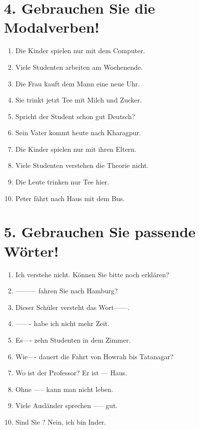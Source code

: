 \documentclass[a4paper,12pt]{article}
\begin{document}
\section*{4. Gebrauchen Sie die Modalverben!}

\begin{enumerate}[label=(\alph*)]
    \item Die Kinder spielen nur mit dem Computer.
    \item Viele Studenten arbeiten am Wochenende.
    \item Die Frau kauft dem Mann eine neue Uhr.
    \item Sie trinkt jetzt Tee mit Milch und Zucker.
    \item Spricht der Student schon gut Deutsch?
    \item Sein Vater kommt heute nach Kharagpur.
    \item Die Kinder spielen nur mit ihren Eltern.
    \item Viele Studenten verstehen die Theorie nicht.
    \item Die Leute trinken nur Tee hier.
    \item Peter fährt nach Haus mit dem Bus.
\end{enumerate}

\section*{5. Gebrauchen Sie passende Wörter!}

\begin{enumerate}[label=(\alph*)]
    \item Ich verstehe nicht. Können Sie bitte noch \underline{\hspace{3cm}} erklären?
    \item --------- fahren Sie nach Hamburg?
    \item Dieser Schüler versteht das Wort------.
    \item ------- habe ich nicht mehr Zeit.
    \item Es---- zehn Studenten in dem Zimmer.
    \item Wie---- dauert die Fahrt von Howrah bis Tatanagar?
    \item Wo ist der Professor? Er ist --- Haus.
    \item Ohne ----- kann man nicht leben.
    \item Viele Ausländer sprechen ----- gut.
    \item Sind Sie \underline{\hspace{1cm}}? Nein, ich bin Inder.
\end{enumerate}
\end{document}
